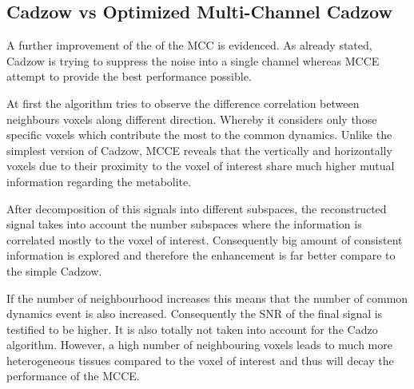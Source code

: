 \subsection{Cadzow vs Optimized Multi-Channel Cadzow }


A further improvement of the of the MCC is evidenced. As already stated, Cadzow is trying to suppress the noise into a single channel whereas MCCE attempt to provide the best performance possible.

At first the algorithm tries to observe the difference correlation between neighbours voxels along different direction. Whereby it considers only those specific voxels which contribute the most to the common dynamics. Unlike the simplest version of Cadzow, MCCE reveals that the vertically and horizontally voxels due to their proximity to the voxel of interest share much higher mutual information regarding the metabolite. 

After decomposition of this signals into different subspaces, the reconstructed signal takes into account the number subspaces where the information is correlated mostly to the voxel of interest. Consequently big amount of consistent information is explored and therefore the enhancement is far better compare to the simple Cadzow.

If the number of neighbourhood increases this means that the number of common dynamics event is also increased. Consequently the SNR of the final signal is testified to be higher. It is also totally not taken into account for the Cadzo algorithm. However, a high number of neighbouring voxels leads to much more heterogeneous tissues compared to the voxel of interest and thus will decay the performance of the MCCE.
